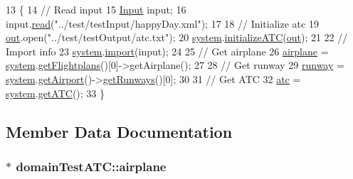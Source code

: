 \begin{DoxyCode}
13                          \{
14         \textcolor{comment}{// Read input}
15         \hyperlink{classInput}{Input} input;
16         input.\hyperlink{classInput_abb78078475f91c654db63c392aefbf51}{read}(\textcolor{stringliteral}{"../test/testInput/happyDay.xml"});
17         
18         \textcolor{comment}{// Initialize atc}
19         \hyperlink{classdomainTestATC_ab5da7bf2ad4ca4231a2eb91664a11f5b}{out}.open(\textcolor{stringliteral}{"../test/testOutput/atc.txt"});
20         \hyperlink{classdomainTestATC_a1cb61e4379ab7424f536bcdb4ec339cc}{system}.\hyperlink{classSystem_a5e9a3f6b8d3d5cb99c041bfcaace9683}{initializeATC}(\hyperlink{classdomainTestATC_ab5da7bf2ad4ca4231a2eb91664a11f5b}{out});
21 
22         \textcolor{comment}{// Import info}
23         \hyperlink{classdomainTestATC_a1cb61e4379ab7424f536bcdb4ec339cc}{system}.\hyperlink{classSystem_ad1f1022247d9556d0ce4061bb68572cc}{import}(input);
24 
25         \textcolor{comment}{// Get airplane}
26         \hyperlink{classdomainTestATC_a30f8d738256ddda4c85864a5c4cf8eb5}{airplane} = \hyperlink{classdomainTestATC_a1cb61e4379ab7424f536bcdb4ec339cc}{system}.\hyperlink{classSystem_a14a06028897516eb4df651220e70ce8f}{getFlightplans}()[0]->getAirplane();
27 
28         \textcolor{comment}{// Get runway}
29         \hyperlink{classdomainTestATC_a02691fdbeeca3a709416c0dfe0448051}{runway} = \hyperlink{classdomainTestATC_a1cb61e4379ab7424f536bcdb4ec339cc}{system}.\hyperlink{classSystem_a8cd2a9b13cdbcf30f801e46cf8284800}{getAirport}()->\hyperlink{classAirport_a14310ffeba8a024105071c156fd42cf7}{getRunways}()[0];
30 
31         \textcolor{comment}{// Get ATC}
32         \hyperlink{classdomainTestATC_a36d12fcd41f87e8d7bc1af309a9484d5}{atc} = \hyperlink{classdomainTestATC_a1cb61e4379ab7424f536bcdb4ec339cc}{system}.\hyperlink{classSystem_aae418c2545087b63188f4a4ffb2e9d15}{getATC}();
33     \}
\end{DoxyCode}


\subsection{Member Data Documentation}
\subsubsection[{\texorpdfstring{airplane}{airplane}}]{$\ast$ domain\+Test\+A\+T\+C\+::airplane\hspace{0.3cm}{\ttfamily [protected]}}\hypertarget{classdomainTestATC_a30f8d738256ddda4c85864a5c4cf8eb5}{}\label{classdomainTestATC_a30f8d738256ddda4c85864a5c4cf8eb5}
